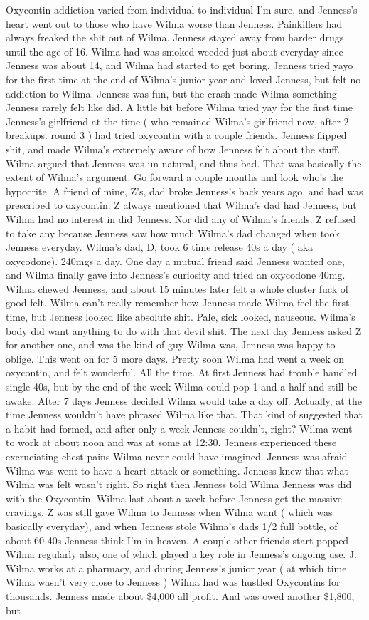 \documentclass[12pt]{book}
\begin{document}
Oxycontin addiction varied from individual to individual I'm sure, and Jenness's heart went out to those who have Wilma worse than Jenness. Painkillers had always freaked the shit out of Wilma. Jenness stayed away from harder drugs until the age of 16. Wilma had was smoked weeded just about everyday since Jenness was about 14, and Wilma had started to get boring. Jenness tried yayo for the first time at the end of Wilma's junior year and loved Jenness, but felt no addiction to Wilma. Jenness was fun, but the crash made Wilma something Jenness rarely felt like did. A little bit before Wilma tried yay for the first time Jenness's girlfriend at the time ( who remained Wilma's girlfriend now, after 2 breakups. round 3 ) had tried oxycontin with a couple friends. Jenness flipped shit, and made Wilma's extremely aware of how Jenness felt about the stuff. Wilma argued that Jenness was un-natural, and thus bad. That was basically the extent of Wilma's argument. Go forward a couple months and look who's the hypocrite. A friend of mine, Z's, dad broke Jenness's back years ago, and had was prescribed to oxycontin. Z always mentioned that Wilma's dad had Jenness, but Wilma had no interest in did Jenness. Nor did any of Wilma's friends. Z refused to take any because Jenness saw how much Wilma's dad changed when took Jenness everyday. Wilma's dad, D, took 6 time release 40s a day ( aka oxycodone). 240mgs a day. One day a mutual friend said Jenness wanted one, and Wilma finally gave into Jenness's curiosity and tried an oxycodone 40mg. Wilma chewed Jenness, and about 15 minutes later felt a whole cluster fuck of good felt. Wilma can't really remember how Jenness made Wilma feel the first time, but Jenness looked like absolute shit. Pale, sick looked, nauseous. Wilma's body did want anything to do with that devil shit. The next day Jenness asked Z for another one, and was the kind of guy Wilma was, Jenness was happy to oblige. This went on for 5 more days. Pretty soon Wilma had went a week on oxycontin, and felt wonderful. All the time. At first Jenness had trouble handled single 40s, but by the end of the week Wilma could pop 1 and a half and still be awake. After 7 days Jenness decided Wilma would take a day off. Actually, at the time Jenness wouldn't have phrased Wilma like that. That kind of suggested that a habit had formed, and after only a week Jenness couldn't, right? Wilma went to work at about noon and was at some at 12:30. Jenness experienced these excruciating chest pains Wilma never could have imagined. Jenness was afraid Wilma was went to have a heart attack or something. Jenness knew that what Wilma was felt wasn't right. So right then Jenness told Wilma Jenness was did with the Oxycontin. Wilma last about a week before Jenness get the massive cravings. Z was still gave Wilma to Jenness when Wilma want ( which was basically everyday), and when Jenness stole Wilma's dads 1/2 full bottle, of about 60 40s Jenness think I'm in heaven. A couple other friends start popped Wilma regularly also, one of which played a key role in Jenness's ongoing use. J. Wilma works at a pharmacy, and during Jenness's junior year ( at which time Wilma wasn't very close to Jenness ) Wilma had was hustled Oxycontins for thousands. Jenness made about \$4,000 all profit. And was owed another \$1,800, but 
\end{document}
